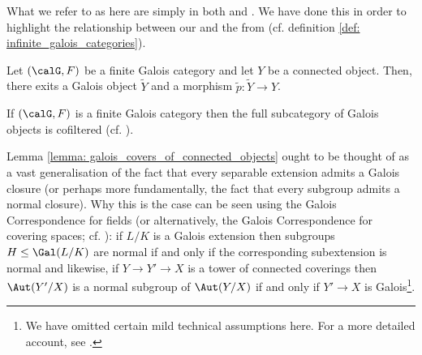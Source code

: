             \begin{remark}
                What we refer to as  here are simply  in both \cite[Expos\'e V]{SGA1} and \cite[\href{https://stacks.math.columbia.edu/tag/0BMQ}{Tag 0BMQ}]{stacks}. We have done this in order to highlight the relationship between our  and the  from \cite[Section 7]{bhatt_scholze_2014_pro_etale} (cf. definition \ref{def: infinite_galois_categories}).
            \end{remark}
            
            \begin{lemma} \label{lemma: galois_covers_of_connected_objects}
                \cite[\href{https://stacks.math.columbia.edu/tag/0BN2}{Tag 0BN2}]{stacks} Let $(\calG, F)$ be a finite Galois category and let $Y$ be a connected object. Then, there exits a Galois object $\tilde{Y}$ and a morphism $\tilde{p}: \tilde{Y} \to Y$.
            \end{lemma} 
            \begin{corollary} \label{coro: cofiltered_diagrams_of_Galois_objects_in_a_finite_Galois_category}
                If $(\calG, F)$ is a finite Galois category then the full subcategory of Galois objects is cofiltered (cf. \cite[\href{https://stacks.math.columbia.edu/tag/00D3}{Tag 00D3}]{stacks}).
            \end{corollary}
            \begin{remark}
                Lemma \ref{lemma: galois_covers_of_connected_objects} ought to be thought of as a vast generalisation of the fact that every separable extension admits a Galois closure (or perhaps more fundamentally, the fact that every subgroup admits a normal closure). Why this is the case can be seen using the Galois Correspondence for fields (or alternatively, the Galois Correspondence for covering spaces; cf. \cite[Theorem 1.38]{hatcher2002algebraic}): if $L/K$ is a Galois extension then subgroups $H \leq \Gal(L/K)$ are normal if and only if the corresponding subextension is normal and likewise, if $Y \to Y' \to X$ is a tower of connected coverings then $\Aut(Y'/X)$ is a normal subgroup of $\Aut(Y/X)$ if and only if $Y' \to X$ is Galois\footnote{We have omitted certain mild technical assumptions here. For a more detailed account, see \cite[Section 1.3]{hatcher2002algebraic}.}. 
            \end{remark}
